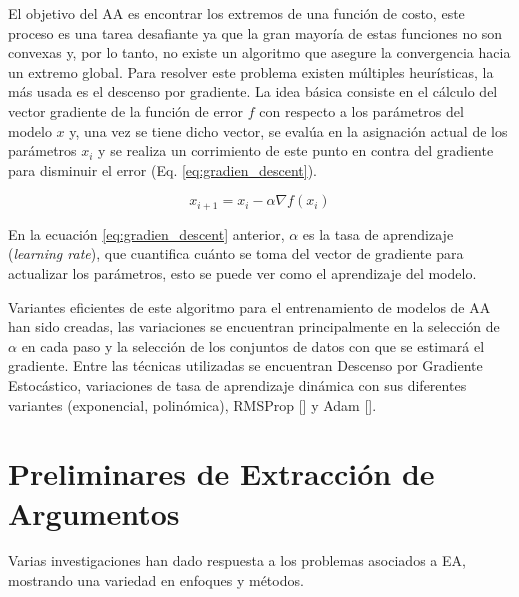 El objetivo del AA es encontrar los extremos de una función de costo, este proceso es una tarea 
desafiante ya que la gran mayoría de estas funciones no son convexas y, por lo tanto, no existe un algoritmo
que asegure la convergencia hacia un extremo global. Para resolver este problema existen múltiples heurísticas,
la más usada es el descenso por gradiente. La idea básica consiste 
en el cálculo del vector gradiente de la función de error $f$ con respecto a los parámetros del modelo $x$ y, una vez se 
tiene dicho vector, se evalúa en la asignación actual de los parámetros $x_i$ y se realiza un corrimiento de este punto 
en contra del gradiente para disminuir el error (Eq. \ref{eq:gradien_descent}).

\begin{equation}
	x_{i+1} = x_i - \alpha \nabla f(x_i)\label{eq:gradien_descent}
\end{equation}

En la ecuación \ref{eq:gradien_descent} anterior, $\alpha$ es la tasa de aprendizaje (\emph{learning rate}),
que cuantifica cuánto se toma del vector de gradiente para actualizar los parámetros, esto 
se puede ver como el aprendizaje del modelo.

Variantes eficientes de este algoritmo para el entrenamiento de modelos de AA han sido 
creadas, las variaciones se encuentran principalmente en la selección de $\alpha$ en cada paso y la 
selección de los conjuntos de datos con que se estimará el gradiente. Entre las técnicas utilizadas se 
encuentran Descenso por Gradiente Estocástico, variaciones de tasa de aprendizaje dinámica con 
sus diferentes variantes (exponencial, polinómica), RMSProp [\cite{tieleman2012rmsp}] 
y Adam [\cite{kingma2014adam}].

\section{Preliminares de Extracción de Argumentos}

Varias investigaciones han dado respuesta a los problemas asociados a EA, mostrando
una variedad en enfoques y métodos.

